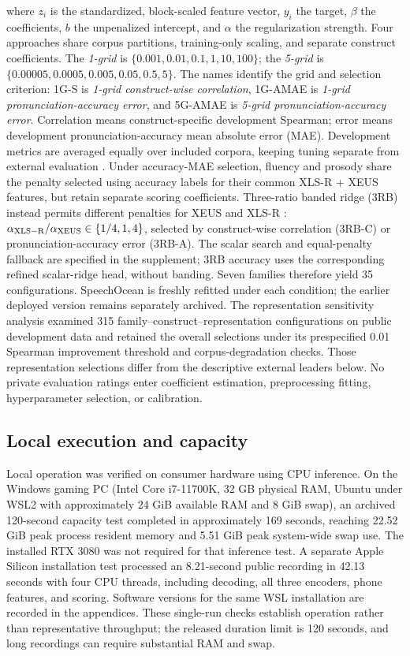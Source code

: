 \documentclass[10pt]{article}
\begin{document}
where $z_i$ is the standardized, block-scaled feature vector, $y_i$ the target, $\beta$ the coefficients, $b$ the unpenalized intercept, and $\alpha$ the regularization strength. Four approaches share corpus partitions, training-only scaling, and separate construct coefficients. The \emph{1-grid} is $\{0.001,0.01,0.1,1,10,100\}$; the \emph{5-grid} is $\{0.00005,0.0005,0.005,0.05,0.5,5\}$. The names identify the grid and selection criterion: 1G-S is \emph{1-grid construct-wise correlation}, 1G-AMAE is \emph{1-grid pronunciation-accuracy error}, and 5G-AMAE is \emph{5-grid pronunciation-accuracy error}. Correlation means construct-specific development Spearman; error means development pronunciation-accuracy mean absolute error (MAE). Development metrics are averaged equally over included corpora, keeping tuning separate from external evaluation \cite{cawley}. Under accuracy-MAE selection, fluency and prosody share the penalty selected using accuracy labels for their common XLS-R + XEUS features, but retain separate scoring coefficients. Three-ratio banded ridge (3RB) instead permits different penalties for XEUS and XLS-R \cite{banded}: $\alpha_{\rm XLS-R}/\alpha_{\rm XEUS}\in\{1/4,1,4\}$, selected by construct-wise correlation (3RB-C) or pronunciation-accuracy error (3RB-A). The scalar search and equal-penalty fallback are specified in the supplement; 3RB accuracy uses the corresponding refined scalar-ridge head, without banding. Seven families therefore yield 35 configurations. SpeechOcean is freshly refitted under each condition; the earlier deployed version remains separately archived. The representation sensitivity analysis examined 315 family--construct--representation configurations on public development data and retained the overall selections under its prespecified 0.01 Spearman improvement threshold and corpus-degradation checks. Those representation selections differ from the descriptive external leaders below. No private evaluation ratings enter coefficient estimation, preprocessing fitting, hyperparameter selection, or calibration.



\subsection{Local execution and capacity}
Local operation was verified on consumer hardware using CPU inference. On the Windows gaming PC (Intel Core i7-11700K, 32 GB physical RAM, Ubuntu under WSL2 with approximately 24 GiB available RAM and 8 GiB swap), an archived 120-second capacity test completed in approximately 169 seconds, reaching 22.52 GiB peak process resident memory and 5.51 GiB peak system-wide swap use. The installed RTX 3080 was not required for that inference test. A separate Apple Silicon installation test processed an 8.21-second public recording in 42.13 seconds with four CPU threads, including decoding, all three encoders, phone features, and scoring. Software versions for the same WSL installation are recorded in the appendices. These single-run checks establish operation rather than representative throughput; the released duration limit is 120 seconds, and long recordings can require substantial RAM and swap.
\end{document}
